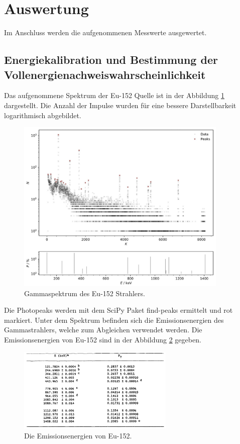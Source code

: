 \section{Auswertung}
\label{sec:auswertung}

Im Anschluss werden die aufgenommenen Messwerte ausgewertet.

\subsection{Energiekalibration und Bestimmung der Vollenergienachweiswahrscheinlichkeit}
\label{sec:auswertung1}

Das aufgenommene Spektrum der Eu-152 Quelle ist in der Abbildung \ref{fig:plot1}
dargestellt. Die Anzahl der Impulse wurden für eine bessere Darstellbarkeit logarithmisch abgebildet. 

\begin{figure}[H]
    \centering
    \includegraphics[width=0.9\textwidth]{content/plots/plot1.jpg}
   \caption{Gammaspektrum des Eu-152 Strahlers.}
    \label{fig:plot1}
\end{figure}

Die Photopeaks werden mit dem SciPy Paket find-peaks ermittelt und rot markiert.
Unter dem Spektrum befinden sich die Emissionsenergien des Gammastrahlers, welche zum Abgleichen verwendet werden.
Die Emissionsenergien von Eu-152 sind in der Abbildung \ref{fig:euE} gegeben.

\begin{figure}[H]
    \centering
    \includegraphics[width=0.666\textwidth]{content/grafik/euenergien.jpg}
    \caption{Die Emissionsenergien von Eu-152. \cite{Kalibration}}
    \label{fig:euE}
\end{figure}

